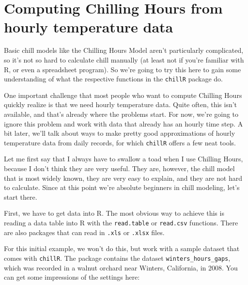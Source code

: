 \documentclass[
]{book}
\begin{document}
\hypertarget{computing-chilling-hours-from-hourly-temperature-data}{%
\section{Computing Chilling Hours from hourly temperature data}\label{computing-chilling-hours-from-hourly-temperature-data}}

Basic chill models like the Chilling Hours Model aren't particularly complicated, so it's not so hard to calculate chill manually (at least not if you're familiar with R, or even a spreadsheet program). So we're going to try this here to gain some understanding of what the respective functions in the \texttt{chillR} package do.

One important challenge that most people who want to compute Chilling Hours quickly realize is that we need hourly temperature data. Quite often, this isn't available, and that's already where the problems start. For now, we're going to ignore this problem and work with data that already has an hourly time step. A bit later, we'll talk about ways to make pretty good approximations of hourly temperature data from daily records, for which \texttt{chillR} offers a few neat tools.

Let me first say that I always have to swallow a toad when I use Chilling Hours, because I don't think they are very useful. They are, however, the chill model that is most widely known, they are very easy to explain, and they are not hard to calculate. Since at this point we're absolute beginners in chill modeling, let's start there.

First, we have to get data into R. The most obvious way to achieve this is reading a data table into R with the \texttt{read.table} or \texttt{read.csv} functions. There are also packages that can read in \texttt{.xls} or \texttt{.xlsx} files.

For this initial example, we won't do this, but work with a sample dataset that comes with \texttt{chillR}. The package contains the dataset \texttt{winters\_hours\_gaps}, which was recorded in a walnut orchard near Winters, California, in 2008. You can get some impressions of the settings here:
\end{document}
